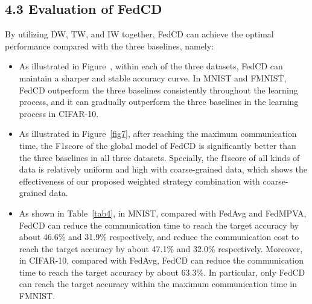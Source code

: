 \documentclass[twoside,twocolumn]{article}
\begin{document}
\begin{spacing}{1.0}
\subsection{4.3 Evaluation of FedCD}
	By utilizing DW, TW, and IW together, FedCD can achieve the optimal performance compared with the three baselines, namely:
\begin{itemize}
\vspace{-0.05cm}
	\item As illustrated in Figure~, within each of the three datasets, FedCD can maintain a sharper and stable accuracy curve. In MNIST and FMNIST, FedCD outperform the three baselines consistently throughout the learning process, and it can gradually outperform the three baselines in the learning process in CIFAR-10.
\vspace{-0.05cm}
	\item As illustrated in Figure~\ref{fig7}, after reaching the maximum communication time, the F1score of the global model of FedCD is significantly better than the three baselines in all three datasets. Specially, the f1score of all kinds of data is relatively uniform and high with coarse-grained data, which shows the effectiveness of our proposed weighted strategy combination with coarse-grained data.
 \vspace{-0.2cm}
	\item As shown in Table~\ref{tab4}, in MNIST, compared with FedAvg and FedMPVA, FedCD can reduce the communication time to reach the target accuracy by about 46.6\% and 31.9\% respectively, and reduce the communication cost to reach the target accuracy by about 47.1\% and 32.0\% respectively. Moreover, in CIFAR-10, compared with FedAvg, FedCD can reduce the communication time to reach the target accuracy by about 63.3\%. In particular, only FedCD can reach the target accuracy within the maximum communication time in FMNIST.
\end{itemize}


\end{spacing}
\end{document}

